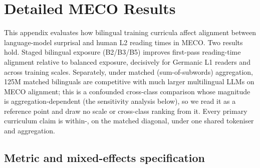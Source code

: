 \section{Detailed MECO Results}\label{sec:meco-results}
 
This appendix evaluates how bilingual training curricula affect alignment between language-model surprisal and human L2 reading times in MECO. Two results hold. Staged bilingual exposure (B2/B3/B5) improves first-pass reading-time alignment relative to balanced exposure, decisively for Germanic L1 readers and across training scales. Separately, under matched (sum-of-subwords) aggregation, 125M matched bilinguals are competitive with much larger multilingual LLMs on MECO alignment; this is a confounded cross-class comparison whose magnitude is aggregation-dependent (the sensitivity analysis below), so we read it as a reference point and draw no scale or cross-class ranking from it. Every primary curriculum claim is within-\beetle{}, on the matched diagonal, under one shared tokeniser and aggregation.
 
\subsection{Metric and mixed-effects specification}\label{sec:meco-metric-app}
 
